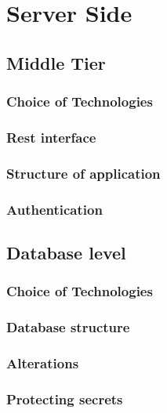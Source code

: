 


\section{Server Side}

\subsection{Middle Tier}

\subsubsection*{Choice of Technologies}

\subsubsection*{Rest interface}

\subsubsection*{Structure of application}

\subsubsection*{Authentication}



\subsection{Database level}

\subsubsection*{Choice of Technologies}

\subsubsection*{Database structure}

\subsubsection*{Alterations}

\subsubsection*{Protecting secrets}